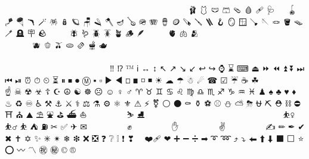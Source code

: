 \documentclass{article}
\begin{document}
🧟‍♀️ 🧟‍♂️ 🧟 🧠 🧡 🧢 🧣 🧤 🧥 🧦 🧧 🧨 🧩 🧪 🧫 🧬 🧭 🧮 🧯 🧰 🧱 🧲 🧳 🧴 🧵 🧶 🧷 🧸 🧹 🧺 🧻 🧼 🧽 🧾 🧿 🩰 🩱 🩲 🩳 🩴 🩸 🩹 🩺 🩻 🩼 🪀 🪁 🪂 🪃 🪄 🪅 🪆 🪐 🪑 🪒 🪓 🪔 🪕 🪖 🪗 🪘 🪙 🪚 🪛 🪜 🪝 🪞 🪟 🪠 🪡 🪢 🪣 🪤 🪥 🪦 🪧 🪨 🪩 🪪 🪫 🪬 🪰 🪱 🪲 🪳 🪴 🪵 🪶 🪷 🪸 🪹 🪺 🫀 🫁 🫂 🫃🏻 🫃🏼 🫃🏽 🫃🏾 🫃🏿 🫃 🫄🏻 🫄🏼 🫄🏽 🫄🏾 🫄🏿 🫄 🫅🏻 🫅🏼 🫅🏽 🫅🏾 🫅🏿 🫅 🫐 🫑 🫒 🫓 🫔 🫕 🫖 🫗 🫘 🫙 🫠 🫡 🫢 🫣 🫤 🫥 🫦 🫧 🫰🏻 🫰🏼 🫰🏽 🫰🏾 🫰🏿 🫰 🫱🏻‍🫲🏼 🫱🏻‍🫲🏽 🫱🏻‍🫲🏾 🫱🏻‍🫲🏿 🫱🏻 🫱🏼‍🫲🏻 🫱🏼‍🫲🏽 🫱🏼‍🫲🏾 🫱🏼‍🫲🏿 🫱🏼 🫱🏽‍🫲🏻 🫱🏽‍🫲🏼 🫱🏽‍🫲🏾 🫱🏽‍🫲🏿 🫱🏽 🫱🏾‍🫲🏻 🫱🏾‍🫲🏼 🫱🏾‍🫲🏽 🫱🏾‍🫲🏿 🫱🏾 🫱🏿‍🫲🏻 🫱🏿‍🫲🏼 🫱🏿‍🫲🏽 🫱🏿‍🫲🏾 🫱🏿 🫱 🫲🏻 🫲🏼 🫲🏽 🫲🏾 🫲🏿 🫲 🫳🏻 🫳🏼 🫳🏽 🫳🏾 🫳🏿 🫳 🫴🏻 🫴🏼 🫴🏽 🫴🏾 🫴🏿 🫴 🫵🏻 🫵🏼 🫵🏽 🫵🏾 🫵🏿 🫵 🫶🏻 🫶🏼 🫶🏽 🫶🏾 🫶🏿 🫶 ‼ ⁉ ™ ℹ ↔ ↕ ↖ ↗ ↘ ↙ ↩ ↪ ⌚ ⌛ ⌨ ⏏ ⏩ ⏪ ⏫ ⏬ ⏭ ⏮ ⏯ ⏰ ⏱ ⏲ ⏳ ⏸ ⏹ ⏺ Ⓜ ▪ ▫ ▶ ◀ ◻ ◼ ◽ ◾ ☀ ☁ ☂ ☃ ☄ ☎ ☑ ☔ ☕ ☘ ☝🏻 ☝🏼 ☝🏽 ☝🏾 ☝🏿 ☝ ☠ ☢ ☣ ☦ ☪ ☮ ☯ ☸ ☹ ☺ ♀ ♂ ♈ ♉ ♊ ♋ ♌ ♍ ♎ ♏ ♐ ♑ ♒ ♓ ♟ ♠ ♣ ♥ ♦ ♨ ♻ ♾ ♿ ⚒ ⚓ ⚔ ⚕ ⚖ ⚗ ⚙ ⚛ ⚜ ⚠ ⚡ ⚧ ⚪ ⚫ ⚰ ⚱ ⚽ ⚾ ⛄ ⛅ ⛈ ⛎ ⛏ ⛑ ⛓ ⛔ ⛩ ⛪ ⛰ ⛱ ⛲ ⛳ ⛴ ⛵ ⛷🏻 ⛷🏼 ⛷🏽 ⛷🏾 ⛷🏿 ⛷ ⛸ ⛹🏻‍♀️ ⛹🏻‍♂️ ⛹🏻 ⛹🏼‍♀️ ⛹🏼‍♂️ ⛹🏼 ⛹🏽‍♀️ ⛹🏽‍♂️ ⛹🏽 ⛹🏾‍♀️ ⛹🏾‍♂️ ⛹🏾 ⛹🏿‍♀️ ⛹🏿‍♂️ ⛹🏿 ⛹️‍♀️ ⛹️‍♂️ ⛹ ⛺ ⛽ ✂ ✅ ✈ ✉ ✊🏻 ✊🏼 ✊🏽 ✊🏾 ✊🏿 ✊ ✋🏻 ✋🏼 ✋🏽 ✋🏾 ✋🏿 ✋ ✌🏻 ✌🏼 ✌🏽 ✌🏾 ✌🏿 ✌ ✍🏻 ✍🏼 ✍🏽 ✍🏾 ✍🏿 ✍ ✏ ✒ ✔ ✖ ✝ ✡ ✨ ✳ ✴ ❄ ❇ ❌ ❎ ❓ ❔ ❕ ❗ ❣ ❤️‍🔥 ❤️‍🩹 ❤ ➕ ➖ ➗ ➡ ➰ ➿ ⤴ ⤵ ⬅ ⬆ ⬇ ⬛ ⬜ ⭐ ⭕ 〰 〽 ㊗ ㊙ © ®  
\end{document}
